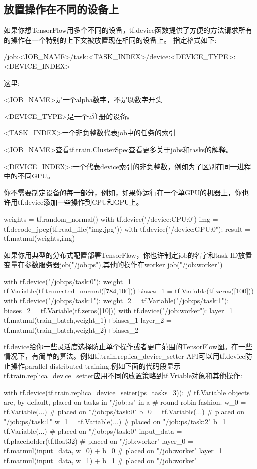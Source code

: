\subsection{放置操作在不同的设备上}
如果你想TensorFlow用多个不同的设备，tf.device函数提供了方便的方法请求所有的操作在一个特别的上下文被放置现在相同的设备上。
指定格式如下:
\begin{python}
/job:<JOB_NAME>/task:<TASK_INDEX>/device:<DEVICE_TYPE>:<DEVICE_INDEX>
\end{python}
这里:
\begin{python}
\item <JOB_NAME>是一个alpha数字，不是以数字开头
\item <DEVICE_TYPE>是一个u注册的设备。
\item <TASK_INDEX>一个非负整数代表job中的任务的索引
\item <JOB_NAME>查看tf.train.ClusterSpec查看更多关于jobs和tasks的解释。
\item <DEVICE_INDEX>:一个代表device索引的非负整数，例如为了区别在同一进程中的不同GPU。
\end{python}
你不需要制定设备的每一部分，例如，如果你运行在一个单GPU的机器上，你也许用tf.device添加一些操作到CPU和GPU上。
\begin{python}
weights = tf.random_normal()
with tf.device("/device:CPU:0")
    img = tf.decode_jpeg(tf.read_file("img.jpg"))
with tf.device("/device:GPU:0"):
    result = tf.matmul(weights,img)
\end{python}
如果你用典型的分布式配置部署TensorFlow，你也许制定job的名字和task ID放置变量在参数服务器job("/job:ps"),其他的操作在worker job("/job:worker")
\begin{python}
with tf.device("/job:ps/task:0"):
    weight_1 = tf.Variable(tf.truncated_normal([784,100]))
    biases_1 = tf.Variable(tf.zeros([100]))
with tf.device("/job:ps/task:1"):
    weight_2 = tf.Variable("/job:ps/task:1"):
    biases_2 = tf.Variable(tf.zeros([10]))
with tf.device("/job:worker"):
    layer_1 = tf.matmul(train_batch,weight_1)+biases_1
    layer_2 = tf.matmul(train_batch,weight_2)+biases_2
\end{python}
tf.device给你一些灵活度选择防止单个操作或者更广范围的TensorFlow图。在一些情况下，有简单的算法。例如tf.train.replica\_device\_setter API可以用tf.device防止操作parallel distributed training.例如下面的代码段显示tf.train.replica\_device\_setter应用不同的放置策略到tf.Vriable对象和其他操作:
\begin{python}
with tf.device(tf.train.replica_device_setter(ps_tasks=3)):
# tf.Variable objects are, by default, placed on tasks in "/job:ps" in a
# round-robin fashion.
    w_0 = tf.Variable(...)  # placed on "/job:ps/task:0"
    b_0 = tf.Variable(...)  # placed on "/job:ps/task:1"
    w_1 = tf.Variable(...)  # placed on "/job:ps/task:2"
    b_1 = tf.Variable(...)  # placed on "/job:ps/task:0"
    input_data = tf.placeholder(tf.float32)     # placed on "/job:worker"
    layer_0 = tf.matmul(input_data, w_0) + b_0  # placed on "/job:worker"
    layer_1 = tf.matmul(input_data, w_1) + b_1  # placed on "/job:worker"
\end{python}
